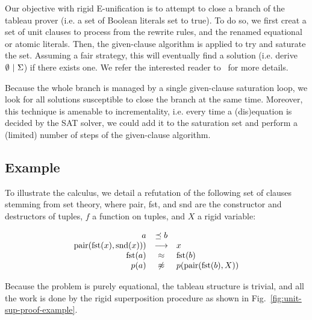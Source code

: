 Our objective with rigid E-unification is to attempt to close a branch of the
tableau prover (i.e. a set of Boolean literals set to true). To do so, we first
creat a set of unit clauses to process from the rewrite rules, and the renamed
equational or atomic literals. Then, the given-clause algorithm is applied to try and
saturate the set. Assuming a fair strategy, this will eventually find a
solution (i.e. derive $\emptyset ~|~ \Sigma$) if there exists
one. We refer the interested reader to~\cite{SS02} for more details.

Because the whole branch is managed by a single given-clause saturation loop, we
look for all solutions susceptible to close the branch at the same time.
Moreover, this technique is amenable to incrementality, i.e. every time a
(dis)equation is decided by the SAT solver, we could add it to the saturation
set and perform a (limited) number of steps of the given-clause algorithm.

\subsection{Example}

To illustrate the calculus, we detail a refutation of the following set of
clauses stemming from set theory, where pair, fst, and snd are the constructor
and destructors of tuples, $f$ a function on tuples, and $X$ a rigid variable:

\[\begin{array}{rcl}
a &\preceq b \\
\text{pair}(\text{fst}(x), \text{snd}(x))) &\longrightarrow& x\\
\text{fst}(a) &\approx& \text{fst}(b)\\
p(a) &\not\approx& p(\text{pair}(\text{fst}(b), X))\\
\end{array}\]

Because the problem is purely equational, the tableau structure is trivial, and
all the work is done by the rigid superposition procedure as shown in
Fig.~\ref{fig:unit-sup-proof-example}.

